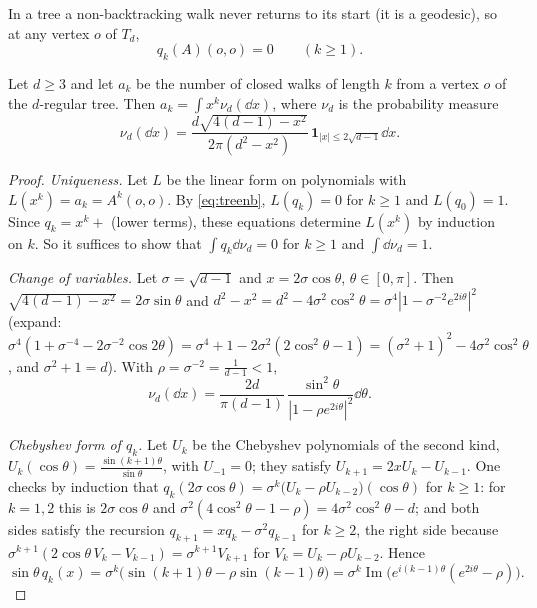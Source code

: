 In a tree a non-backtracking walk never returns to its start (it is a geodesic), so at any vertex $o$ of $T_d$,
\begin{equation}\label{eq:treenb}
q_k(A)(o,o)=0\qquad(k\ge1).
\end{equation}

\begin{theorem}[Kesten, 1959]\label{thm:kestenmeasure}
Let $d\ge3$ and let $a_k$ be the number of closed walks of length $k$ from a vertex $o$ of the $d$-regular tree. Then $a_k=\int x^k\nu_d(\dd x)$, where $\nu_d$ is the probability measure
\[
\nu_d(\dd x)=\frac{d\sqrt{4(d-1)-x^2}}{2\pi(d^2-x^2)}\,\mathbf 1_{|x|\le2\sqrt{d-1}}\dd x.
\]
\end{theorem}

\begin{proof}
\emph{Uniqueness.} Let $L$ be the linear form on polynomials with $L(x^k)=a_k=A^k(o,o)$. By \eqref{eq:treenb}, $L(q_k)=0$ for $k\ge1$ and $L(q_0)=1$. Since $q_k=x^k+$ (lower terms), these equations determine $L(x^k)$ by
induction on $k$. So it suffices to show that $\int q_k\dd\nu_d=0$ for $k\ge1$ and $\int\dd\nu_d=1$.

\emph{Change of variables.} Let $\sigma=\sqrt{d-1}$ and $x=2\sigma\cos\theta$, $\theta\in[0,\pi]$. Then $\sqrt{4(d-1)-x^2}=2\sigma\sin\theta$ and $d^2-x^2=d^2-4\sigma^2\cos^2\theta=\sigma^4|1-\sigma^{-2}e^{2i\theta}|^2$ (expand:
$\sigma^4(1+\sigma^{-4}-2\sigma^{-2}\cos2\theta)=\sigma^4+1-2\sigma^2(2\cos^2\theta-1)=(\sigma^2+1)^2-4\sigma^2\cos^2\theta$, and $\sigma^2+1=d$). With $\rho=\sigma^{-2}=\frac1{d-1}<1$,
\[
\nu_d(\dd x)=\frac{2d}{\pi(d-1)}\,\frac{\sin^2\theta}{|1-\rho e^{2i\theta}|^2}\dd\theta.
\]

\emph{Chebyshev form of $q_k$.} Let $U_k$ be the Chebyshev polynomials of the second kind, $U_k(\cos\theta)=\frac{\sin(k+1)\theta}{\sin\theta}$, with $U_{-1}=0$; they satisfy $U_{k+1}=2xU_k-U_{k-1}$. One checks by induction that
$q_k(2\sigma\cos\theta)=\sigma^k\bigl(U_k-\rho U_{k-2}\bigr)(\cos\theta)$ for $k\ge1$: for $k=1,2$ this is $2\sigma\cos\theta$ and $\sigma^2(4\cos^2\theta-1-\rho)=4\sigma^2\cos^2\theta-d$; and both sides satisfy the recursion
$q_{k+1}=xq_k-\sigma^2q_{k-1}$ for $k\ge2$, the right side because $\sigma^{k+1}(2\cos\theta\,V_k-V_{k-1})=\sigma^{k+1}V_{k+1}$ for $V_k=U_k-\rho U_{k-2}$. Hence
\[
\sin\theta\,q_k(x)=\sigma^k\bigl(\sin(k+1)\theta-\rho\sin(k-1)\theta\bigr)=\sigma^k\operatorname{Im}\bigl(e^{i(k-1)\theta}(e^{2i\theta}-\rho)\bigr).
\]


\end{proof}
